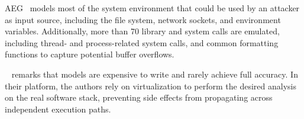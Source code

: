 {\sc AEG}~\cite{AEG-NDSS11} models most of the system environment that could be used by an attacker as input source, including the file system, network sockets, and environment variables. Additionally, more than 70 library and system calls are emulated, including thread- and process-related system calls, and common formatting functions to capture potential buffer overflows. %

{\sc \stwoe}~\cite{CKC-TOCS12} remarks that models are expensive to write and rarely achieve full accuracy.
In their platform, the authors rely on virtualization to perform the desired analysis on the real software stack, preventing side effects from propagating across independent execution paths. 
